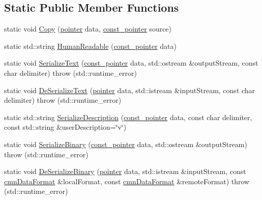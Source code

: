 \subsection*{Static Public Member Functions}
\begin{DoxyCompactItemize}
\item 
static void \hyperlink{classcmn_data_3_01__element_type[__size]_4_af9e38a0f19a8ec2923befe529dec2677}{Copy} (\hyperlink{classcmn_data_3_01__element_type[__size]_4_ad12f77b67872d7ed06978b393bc3d29e}{pointer} data, \hyperlink{classcmn_data_3_01__element_type[__size]_4_aaf9e2a181a2500f07b6c99b2bf42477f}{const\+\_\+pointer} source)
\item 
static std\+::string \hyperlink{classcmn_data_3_01__element_type[__size]_4_ab8b19562bfd4f91f8bac12bca4b1dd68}{Human\+Readable} (\hyperlink{classcmn_data_3_01__element_type[__size]_4_aaf9e2a181a2500f07b6c99b2bf42477f}{const\+\_\+pointer} data)
\item 
static void \hyperlink{classcmn_data_3_01__element_type[__size]_4_a1019040d758dae14bb0ff3d5a945e26b}{Serialize\+Text} (\hyperlink{classcmn_data_3_01__element_type[__size]_4_aaf9e2a181a2500f07b6c99b2bf42477f}{const\+\_\+pointer} data, std\+::ostream \&output\+Stream, const char delimiter)  throw (std\+::runtime\+\_\+error)
\item 
static void \hyperlink{classcmn_data_3_01__element_type[__size]_4_a8f48d2bc16c9c0c38290446d20f02773}{De\+Serialize\+Text} (\hyperlink{classcmn_data_3_01__element_type[__size]_4_ad12f77b67872d7ed06978b393bc3d29e}{pointer} data, std\+::istream \&input\+Stream, const char delimiter)  throw (std\+::runtime\+\_\+error)
\item 
static std\+::string \hyperlink{classcmn_data_3_01__element_type[__size]_4_a8a5bf1cc4b195150796f3a29b3886218}{Serialize\+Description} (\hyperlink{classcmn_data_3_01__element_type[__size]_4_aaf9e2a181a2500f07b6c99b2bf42477f}{const\+\_\+pointer} data, const char delimiter, const std\+::string \&user\+Description=\char`\"{}v\char`\"{})
\item 
static void \hyperlink{classcmn_data_3_01__element_type[__size]_4_a4e4ec21a07bb4e00544e1054f33907b2}{Serialize\+Binary} (\hyperlink{classcmn_data_3_01__element_type[__size]_4_aaf9e2a181a2500f07b6c99b2bf42477f}{const\+\_\+pointer} data, std\+::ostream \&output\+Stream)  throw (std\+::runtime\+\_\+error)
\item 
static void \hyperlink{classcmn_data_3_01__element_type[__size]_4_a08bdd36ee24c3dab50ddab4c0bf0f57a}{De\+Serialize\+Binary} (\hyperlink{classcmn_data_3_01__element_type[__size]_4_ad12f77b67872d7ed06978b393bc3d29e}{pointer} data, std\+::istream \&input\+Stream, const \hyperlink{classcmn_data_format}{cmn\+Data\+Format} \&local\+Format, const \hyperlink{classcmn_data_format}{cmn\+Data\+Format} \&remote\+Format)  throw (std\+::runtime\+\_\+error)

\end{DoxyCompactItemize}
